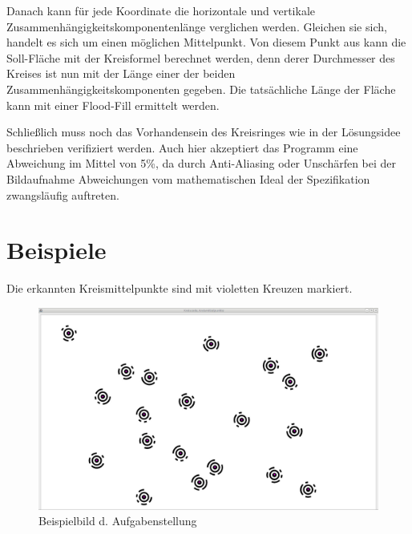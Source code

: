 Danach kann für jede Koordinate die horizontale und vertikale Zusammenhängigkeitskomponentenlänge verglichen werden. Gleichen sie sich, handelt es sich um einen möglichen Mittelpunkt. Von diesem Punkt aus kann die Soll-Fläche mit der Kreisformel berechnet werden, denn derer Durchmesser des Kreises ist nun mit der Länge einer der beiden Zusammenhängigkeitskomponenten gegeben. Die tatsächliche Länge der Fläche kann mit einer Flood-Fill ermittelt werden.

Schließlich muss noch das Vorhandensein des Kreisringes wie in der Lösungsidee beschrieben verifiziert werden. Auch hier akzeptiert das Programm eine Abweichung im Mittel von 5\%, da durch Anti-Aliasing oder Unschärfen bei der Bildaufnahme Abweichungen vom mathematischen Ideal der Spezifikation zwangsläufig auftreten.

\pagebreak
\section{Beispiele}
Die erkannten Kreismittelpunkte sind mit violetten Kreuzen markiert.
\begin{figure}[!ht]
	\centering	
	\includegraphics[width=\textwidth]{sek1bsp1}
	\caption{Beispielbild d. Aufgabenstellung}
\end{figure}